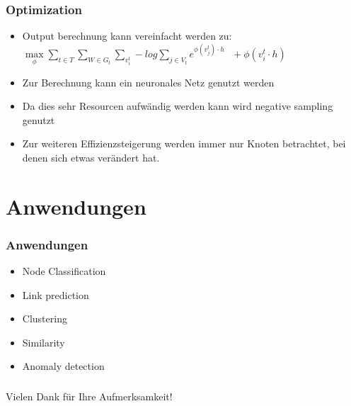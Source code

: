 \documentclass{beamer}
\begin{document}
\begin{frame}
  \frametitle{Optimization}
  \begin{itemize}
    \item Output berechnung kann vereinfacht werden zu:   
    \(\max\limits_\phi \sum\limits_{t \in T}\sum\limits_{W\in G_t}\sum\limits_{v_i^t} -log\sum\limits_{j\in V_t} e^{\phi(v_j^t)\cdot h}\:\:\: +\phi(v_i^t \cdot h)\)
    \item Zur Berechnung kann ein neuronales Netz genutzt werden
    \item Da dies sehr Resourcen aufwändig werden kann wird negative sampling genutzt
    \item Zur weiteren Effizienzsteigerung werden immer nur Knoten betrachtet, bei denen sich etwas verändert hat.
  \end{itemize}
\end{frame}

\section{Anwendungen}
\begin{frame}
  \frametitle{Anwendungen}
  \begin{itemize}
    \item Node Classification
    \item Link prediction
    \item Clustering
    \item Similarity
    \item Anomaly detection
  \end{itemize}
\end{frame}


\begin{frame}
  \frametitle{}
  \begin{center}
    Vielen Dank für Ihre Aufmerksamkeit!
  \end{center}
\end{frame}
\end{document}
